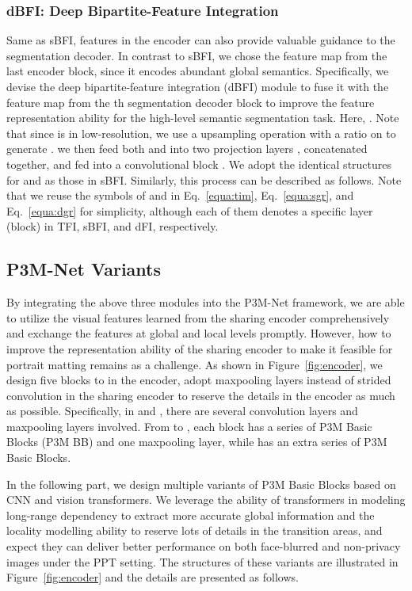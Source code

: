 \documentclass[twocolumn]{svjour3}
\begin{document}
\subsubsection{dBFI: Deep Bipartite-Feature Integration}
Same as sBFI, features in the encoder can also provide valuable guidance to the segmentation decoder. In contrast to sBFI, we chose the feature map  from the last encoder block, since it encodes abundant global semantics. Specifically, we devise the deep bipartite-feature integration (dBFI) module to fuse it with the feature map  from the th segmentation decoder block to improve the feature representation ability for the high-level semantic segmentation task. Here, . Note that since  is in low-resolution, we use a upsampling operation  with a ratio  on  to generate . we then feed both  and  into two projection layers , concatenated together, and fed into a convolutional block . We adopt the identical structures for  and  as those in sBFI. Similarly, this process can be described as follows. Note that we reuse the symbols of  and  in Eq.~\ref{equa:tim}, Eq.~\ref{equa:sgr}, and Eq.~\ref{equa:dgr} for simplicity, although each of them denotes a specific layer (block) in TFI, sBFI, and dFI, respectively.



\subsection{P3M-Net Variants}
\label{sec:variants}
By integrating the above three modules into the P3M-Net framework, we are able to utilize the visual features learned from the sharing encoder comprehensively and exchange the features at global and local levels promptly. However, how to improve the representation ability of the sharing encoder to make it feasible for portrait matting remains as a challenge. As shown in Figure~\ref{fig:encoder}, we design five blocks  to  in the encoder, adopt maxpooling layers instead of strided convolution in the sharing encoder to reserve the details in the encoder as much as possible. Specifically, in  and , there are several convolution layers and maxpooling layers involved. From  to , each block has a series of P3M Basic Blocks (P3M BB) and one maxpooling layer, while  has an extra series of P3M Basic Blocks.

In the following part, we design multiple variants of P3M Basic Blocks based on CNN and vision transformers. We leverage the ability of transformers in modeling long-range dependency to extract more accurate global information and the locality modelling ability to reserve lots of details in the transition areas, and expect they can deliver better performance on both face-blurred and non-privacy images under the PPT setting. The structures of these variants are illustrated in Figure~\ref{fig:encoder} and the details are presented as follows. 
\end{document}
